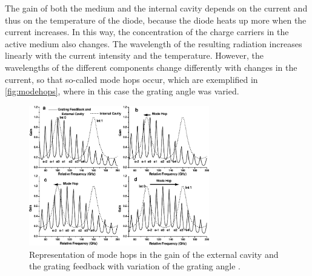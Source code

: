 The gain of both the medium and the internal cavity depends on the current and thus on the temperature of the diode,
because the diode heats up more when the current increases.
In this way, the concentration of the charge carriers in the active medium also changes.
The wavelength of the resulting radiation increases linearly with the current intensity and the temperature.
However, the wavelengths of the different components change differently with changes in the current,
so that so-called mode hops occur,
which are exemplified in \autoref{fig:modehops},
where in this case the grating angle was varied.
\begin{figure}
    \centering
    \includegraphics[width=0.7\textwidth]{content/img/p13_Fig9.pdf}
    \caption{Representation of mode hops in the gain of the external cavity and the grating feedback with variation of the grating angle \cite{versuchsanleitung}.}
    \label{fig:modehops}
\end{figure}
